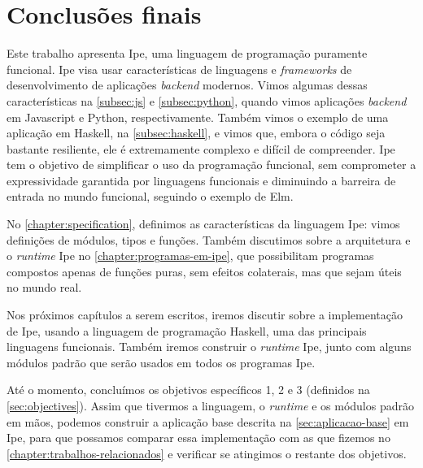 
\chapter{Conclusões finais}

Este trabalho apresenta Ipe, uma linguagem de programação puramente funcional.
Ipe visa usar características de linguagens e \textit{frameworks} de desenvolvimento
de aplicações \textit{backend} modernos. Vimos algumas dessas características na
\autoref{subsec:js} e \autoref{subsec:python}, quando vimos aplicações \textit{backend}
em Javascript e Python, respectivamente. Também vimos o exemplo de uma aplicação
em Haskell, na \autoref{subsec:haskell}, e vimos que, embora o código seja bastante
resiliente, ele é extremamente complexo e difícil de compreender. Ipe tem o objetivo
de simplificar o uso da programação funcional, sem comprometer a expressividade
garantida por linguagens funcionais e diminuindo a barreira de entrada no mundo
funcional, seguindo o exemplo de Elm.

No \autoref{chapter:specification}, definimos as características da linguagem Ipe:
vimos definições de módulos, tipos e funções. Também discutimos sobre a arquitetura
e o \textit{runtime} Ipe no \autoref{chapter:programas-em-ipe}, que possibilitam
programas compostos apenas de funções puras, sem efeitos colaterais, mas que
sejam úteis no mundo real.

Nos próximos capítulos a serem escritos, iremos discutir sobre a implementação
de Ipe, usando a linguagem de programação Haskell, uma das principais linguagens
funcionais. Também iremos construir o \textit{runtime} Ipe, junto com alguns módulos
padrão que serão usados em todos os programas Ipe.

Até o momento, concluímos os objetivos específicos 1, 2 e 3 (definidos na
\autoref{sec:objectives}). Assim que tivermos a linguagem, o \textit{runtime} e
os módulos padrão em mãos, podemos construir a aplicação base descrita na
\autoref{sec:aplicacao-base} em Ipe, para que possamos comparar essa implementação
com as que fizemos no \autoref{chapter:trabalhos-relacionados} e verificar se
atingimos o restante dos objetivos.
